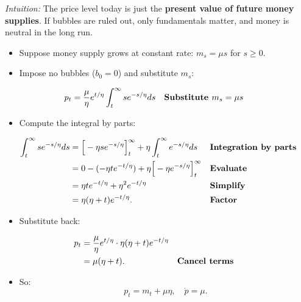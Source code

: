 \documentclass[12pt]{article}
\begin{document}
\textit{Intuition:} The price level today is just the \textbf{present value of future money supplies}.  
If bubbles are ruled out, only fundamentals matter, and money is neutral in the long run.

\begin{itemize}
    \item Suppose money supply grows at constant rate: $m_s = \mu s$ for $s \geq 0$.
    \item Impose no bubbles ($b_0=0$) and substitute $m_s$:
\end{itemize}

\singlespacing
\begin{align}
p_t &= \frac{\mu}{\eta} e^{t/\eta} \int_t^\infty s e^{-s/\eta} ds && \text{\textbf{Substitute $m_s=\mu s$}} 
\end{align}

\begin{itemize}
    \item Compute the integral by parts:
\end{itemize}

\singlespacing
\begin{align}
\int_t^\infty s e^{-s/\eta} ds 
&= \Big[-\eta s e^{-s/\eta}\Big]_t^\infty + \eta \int_t^\infty e^{-s/\eta} ds 
   && \text{\textbf{Integration by parts}} \\
&= 0 - (-\eta t e^{-t/\eta}) + \eta\Big[ -\eta e^{-s/\eta} \Big]_t^\infty && \text{\textbf{Evaluate}} \\
&= \eta t e^{-t/\eta} + \eta^2 e^{-t/\eta} && \text{\textbf{Simplify}} \\
&= \eta(\eta+t)e^{-t/\eta}. && \text{\textbf{Factor}}
\end{align}

\begin{itemize}
    \item Substitute back:
\end{itemize}

\singlespacing
\begin{align}
p_t &= \frac{\mu}{\eta} e^{t/\eta}\cdot \eta(\eta+t)e^{-t/\eta} \\
    &= \mu(\eta+t). && \text{\textbf{Cancel terms}}
\end{align}

\begin{itemize}
    \item So:
    \[
      p_t = m_t + \mu\eta, \quad \dot{p} = \mu.
    \]
\end{itemize}
\end{document}
